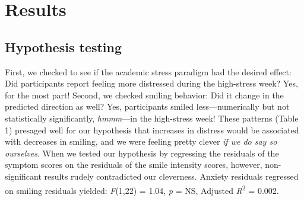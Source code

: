 \documentclass[authordate, empirical,issue]{jote-new-article}
\begin{document}





\section{Results}







\subsection{Hypothesis testing}



First, we checked to see if the academic stress paradigm had the desired effect: Did participants report feeling more distressed during the high-stress week? Yes, for the most part! Second, we checked smiling behavior: Did it change in the predicted direction as well? Yes, participants smiled less—numerically but not statistically significantly, \emph{hmmm}—in the high-stress week! These patterns (Table 1) presaged well for our hypothesis that increases in distress would be associated with decreases in smiling, and we were feeling pretty clever \emph{if we do say so ourselves}. When we tested our hypothesis by regressing the residuals of the symptom scores on the residuals of the smile intensity scores, however, non-significant results rudely contradicted our cleverness. Anxiety residuals regressed on smiling residuals yielded: \emph{F}(1,22) = 1.04, \emph{p} = NS, Adjusted \emph{R}\textsuperscript{2} = 0.002.
\end{document}
